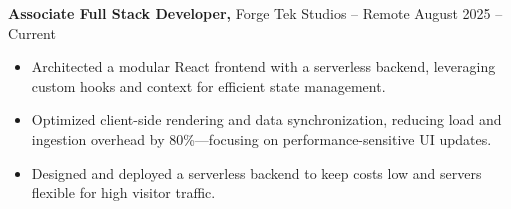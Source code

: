 \documentclass[11pt]{article}       %
\begin{document}
\textbf{Associate Full Stack Developer,} {Forge Tek Studios} -- Remote \hfill August 2025 -- Current 
\vspace{-9pt}
\begin{itemize}
  \item Architected a modular React frontend with a serverless backend, leveraging custom hooks and context for efficient state management.
  \item Optimized client-side rendering and data synchronization, reducing load and ingestion overhead by 80\%---focusing on performance-sensitive UI updates.
  \item Designed and deployed a serverless backend to keep costs low and servers flexible for high visitor traffic.
\end{itemize}

\end{document}
